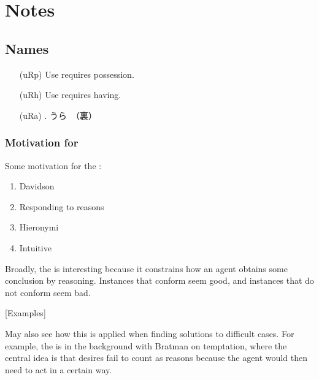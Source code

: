 
\chapter{Notes}
\label{cha:notes}

\section{Names}
\label{sec:names}

\begin{itemize}
\item[(uRp)] Use requires possession.
\item[(uRh)] Use requires having.
\item[(uRa)] \mp{-}.\newline
  うら　（裏）
\end{itemize}



\subsection{Motivation for \mp{}}
\label{sec:motiv-main-prem}

Some motivation for the \mp{}:

\begin{enumerate}
\item Davidson
\item Responding to reasons
\item Hieronymi
\item Intuitive
\end{enumerate}

Broadly, the \mp{} is interesting because it constrains how an agent obtains some conclusion by reasoning.
Instances that conform seem good, and instances that do not conform seem bad.

[Examples]

May also see how this is applied when finding solutions to difficult cases.
For example, the \mp{} is in the background with Bratman on temptation, where the central idea is that desires fail to count as reasons because the agent would then need to act in a certain way.